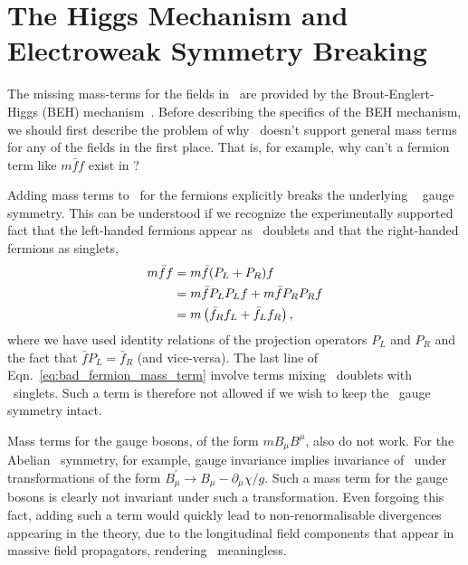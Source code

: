 \section{The Higgs Mechanism and Electroweak Symmetry Breaking}
\label{sec:higgs_description}

The missing mass-terms for the fields in \SML~are provided by the
Brout-Englert-Higgs (BEH) mechanism~\cite{Englert:1964et,Higgs:1964ia,Higgs:1964pj}.
Before describing the specifics of the BEH mechanism, we should first describe the problem
of why \SML~doesn't support general mass terms for any of the fields in the first place.
That is, for example, why can't a fermion term like $m \bar{f} f$ exist in \SML?

Adding mass terms to \SML~for the fermions explicitly breaks the underlying \SUtwo~
gauge symmetry. This can be understood if we recognize the experimentally supported
fact that the left-handed fermions appear as \SUtwo~doublets and that the
right-handed fermions as singlets,
\begin{align}
	m\bar{f}f &= m \bar{f}(P_L + P_R)f \notag \\
				   &= m \bar{f} P_L P_L f + m \bar{f} P_R P_R f  	\label{eq:bad_fermion_mass_term}\\
				   &= m \left( \bar{f}_R f_L + \bar{f}_L f_R \right), \notag
\end{align}
where we have used identity relations of the projection operators $P_L$ and $P_R$ and the fact that $\bar{f}P_L = \bar{f}_R$ (and vice-versa). The last line of Eqn.~\ref{eq:bad_fermion_mass_term} involve terms
mixing \SUtwo~doublets with \SUtwo~singlets. Such a term is therefore not allowed if we wish to keep the \SUtwo~gauge symmetry intact.

Mass terms for the gauge bosons, of the form $m B_{\mu} B^{\mu}$, also do not work. For the Abelian \Uone~symmetry, for example, gauge invariance implies invariance of \SML~under transformations
of the form $B_{\mu}^{\prime} \rightarrow B_{\mu} - \partial_{\mu}\chi /g$. Such a mass term for
the gauge bosons is clearly not invariant under such a transformation. Even forgoing this fact,
adding such a term would quickly lead to non-renormalisable divergences appearing in the theory,
due to the longitudinal field components that appear in massive field propagators, rendering \SML~meaningless.

